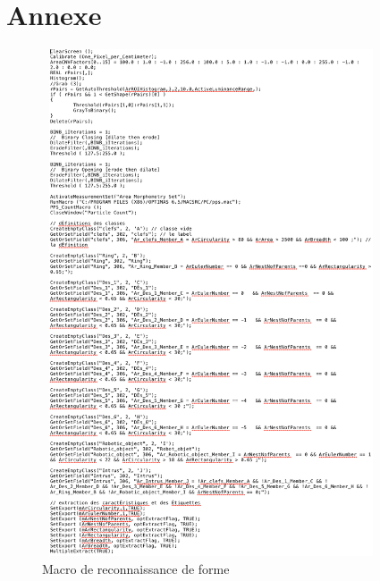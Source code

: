 \documentclass{scrreprt}
\begin{document}
\chapter{Annexe}

\begin{figure}[!h]
\centering
\includegraphics[width=10cm, height=15cm]{images/macro.png}
\caption{Macro de reconnaissance de forme}
\end{figure}
\end{document}
